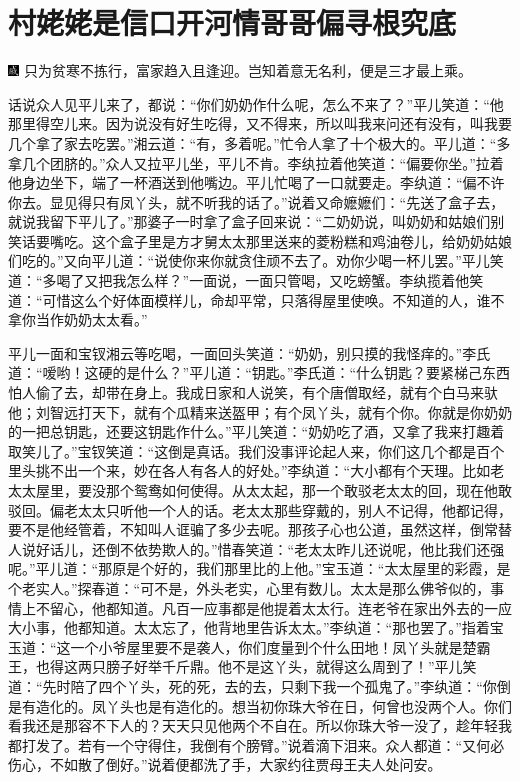 

\chapter{村姥姥是信口开河\hspace{.5em}情哥哥偏寻根究底}

{\includegraphics[width=3mm]{../Images/00005}  \kaishu 只为贫寒不拣行，富家趋入且逢迎。岂知着意无名利，便是三才最上乘。}

话说众人见平儿来了，都说：``你们奶奶作什么呢，怎么不来了？''平儿笑道：``他那里得空儿来。因为说没有好生吃得，又不得来，所以叫我来问还有没有，叫我要几个拿了家去吃罢。''湘云道：``有，多着呢。''忙令人拿了十个极大的。平儿道：``多拿几个团脐的。''众人又拉平儿坐，平儿不肯。李纨拉着他笑道：``偏要你坐。''拉着他身边坐下，端了一杯酒送到他嘴边。平儿忙喝了一口就要走。李纨道：``偏不许你去。显见得只有凤丫头，就不听我的话了。''说着又命嬷嬷们：``先送了盒子去，就说我留下平儿了。''那婆子一时拿了盒子回来说：``二奶奶说，叫奶奶和姑娘们别笑话要嘴吃。这个盒子里是方才舅太太那里送来的菱粉糕和鸡油卷儿，给奶奶姑娘们吃的。''又向平儿道：``说使你来你就贪住顽不去了。劝你少喝一杯儿罢。''平儿笑道：``多喝了又把我怎么样？''一面说，一面只管喝，又吃螃蟹。李纨揽着他笑道：``可惜这么个好体面模样儿，命却平常，只落得屋里使唤。不知道的人，谁不拿你当作奶奶太太看。''

平儿一面和宝钗湘云等吃喝，一面回头笑道：``奶奶，别只摸的我怪痒的。''李氏道：``嗳哟！这硬的是什么？''平儿道：``钥匙。''李氏道：``什么钥匙？要紧梯己东西怕人偷了去，却带在身上。我成日家和人说笑，有个唐僧取经，就有个白马来驮他；刘智远打天下，就有个瓜精来送盔甲；有个凤丫头，就有个你。你就是你奶奶的一把总钥匙，还要这钥匙作什么。''平儿笑道：``奶奶吃了酒，又拿了我来打趣着取笑儿了。''宝钗笑道：``这倒是真话。我们没事评论起人来，你们这几个都是百个里头挑不出一个来，妙在各人有各人的好处。''李纨道：``大小都有个天理。比如老太太屋里，要没那个鸳鸯如何使得。从太太起，那一个敢驳老太太的回，现在他敢驳回。偏老太太只听他一个人的话。老太太那些穿戴的，别人不记得，他都记得，要不是他经管着，不知叫人诓骗了多少去呢。那孩子心也公道，虽然这样，倒常替人说好话儿，还倒不依势欺人的。''惜春笑道：``老太太昨儿还说呢，他比我们还强呢。''平儿道：``那原是个好的，我们那里比的上他。''宝玉道：``太太屋里的彩霞，是个老实人。''探春道：``可不是，外头老实，心里有数儿。太太是那么佛爷似的，事情上不留心，他都知道。凡百一应事都是他提着太太行。连老爷在家出外去的一应大小事，他都知道。太太忘了，他背地里告诉太太。''李纨道：``那也罢了。''指着宝玉道：``这一个小爷屋里要不是袭人，你们度量到个什么田地！凤丫头就是楚霸王，也得这两只膀子好举千斤鼎。他不是这丫头，就得这么周到了！''平儿笑道：``先时陪了四个丫头，死的死，去的去，只剩下我一个孤鬼了。''李纨道：``你倒是有造化的。凤丫头也是有造化的。想当初你珠大爷在日，何曾也没两个人。你们看我还是那容不下人的？天天只见他两个不自在。所以你珠大爷一没了，趁年轻我都打发了。若有一个守得住，我倒有个膀臂。''说着滴下泪来。众人都道：``又何必伤心，不如散了倒好。''说着便都洗了手，大家约往贾母王夫人处问安。

